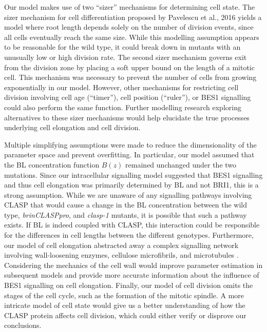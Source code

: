 \documentclass[referee,pdflatex,sn-mathphys-num]{sn-jnl}
\begin{document}
Our model makes use of two ``sizer'' mechanisms for determining cell state.
The sizer mechanism for cell differentiation proposed by Pavelescu et al., 2016 \cite{pavelescu2016} yields a model where root length depends solely on the number of division events, since all cells eventually reach the same size.
While this modelling assumption appears to be reasonable for the wild type, it could break down in mutants with an unusually low or high division rate. 
The second sizer mechanism governs exit from the division zone by placing a soft upper bound on the length of a mitotic cell.
This mechanism was necessary to prevent the number of cells from growing exponentially in our model.
However, other mechanisms for restricting cell division involving cell age (``timer''), cell position (``ruler''), or BES1 signalling could also perform the same function.
Further modelling research exploring alternatives to these sizer mechanisms would help elucidate the true processes underlying cell elongation and cell division.
 
Multiple simplifying assumptions were made to reduce the dimensionality of the parameter space and prevent overfitting.
In particular, our model assumed that the BL concentration function $B(z)$ remained unchanged under the two mutations.
Since our intracellular signalling model suggested that BES1 signalling and thus cell elongation was primarily determined by BL and not BRI1, this is a strong assumption.
While we are unaware of any signalling pathways involving CLASP that would cause a change in the BL concentration between the wild type, \emph{brinCLASPpro}, and \emph{clasp-1} mutants, it is possible that such a pathway exists.
If BL is indeed coupled with CLASP, this interaction could be responsible for the differences in cell lengths between the different genotypes.
Furthermore, our model of cell elongation abstracted away a complex signalling network involving wall-loosening enzymes, cellulose microfibrils, and microtubules \cite{smithers2024}.
Considering the mechanics of the cell wall would improve parameter estimation in subsequent models and provide more accurate information about the influence of BES1 signalling on cell elongation.
Finally, our model of cell division omits the stages of the cell cycle, such as the formation of the mitotic spindle.
A more intricate model of cell state would give us a better understanding of how the CLASP protein affects cell division, which could either verify or disprove our conclusions.

\end{document}
